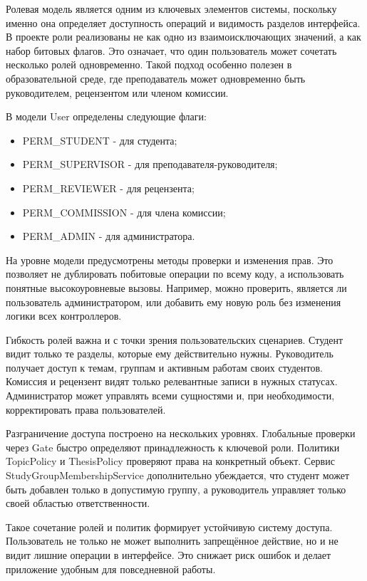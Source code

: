 \documentclass[14pt,a4paper]{extreport}
\begin{document}
Ролевая модель является одним из ключевых элементов системы, поскольку
именно она определяет доступность операций и видимость разделов интерфейса.
В проекте роли реализованы не как одно из взаимоисключающих значений, а как
набор битовых флагов.
Это означает, что один пользователь может сочетать несколько ролей
одновременно.
Такой подход особенно полезен в образовательной среде, где преподаватель
может одновременно быть руководителем, рецензентом или членом комиссии.

В модели User определены следующие флаги:

\begin{itemize}
  \item PERM\_STUDENT - для студента;
  \item PERM\_SUPERVISOR - для преподавателя-руководителя;
  \item PERM\_REVIEWER - для рецензента;
  \item PERM\_COMMISSION - для члена комиссии;
  \item PERM\_ADMIN - для администратора.
\end{itemize}

На уровне модели предусмотрены методы проверки и изменения прав.
Это позволяет не дублировать побитовые операции по всему коду, а использовать
понятные высокоуровневые вызовы.
Например, можно проверить, является ли пользователь администратором, или
добавить ему новую роль без изменения логики всех контроллеров.

Гибкость ролей важна и с точки зрения пользовательских сценариев.
Студент видит только те разделы, которые ему действительно нужны.
Руководитель получает доступ к темам, группам и активным работам своих
студентов.
Комиссия и рецензент видят только релевантные записи в нужных статусах.
Администратор может управлять всеми сущностями и, при необходимости,
корректировать права пользователей.

Разграничение доступа построено на нескольких уровнях.
Глобальные проверки через Gate быстро определяют принадлежность к ключевой
роли.
Политики TopicPolicy и ThesisPolicy проверяют права на конкретный объект.
Сервис StudyGroupMembershipService дополнительно убеждается, что студент
может быть добавлен только в допустимую группу, а руководитель управляет
только своей областью ответственности.

Такое сочетание ролей и политик формирует устойчивую систему доступа.
Пользователь не только не может выполнить запрещённое действие, но и не
видит лишние операции в интерфейсе.
Это снижает риск ошибок и делает приложение удобным для повседневной работы.
\end{document}
